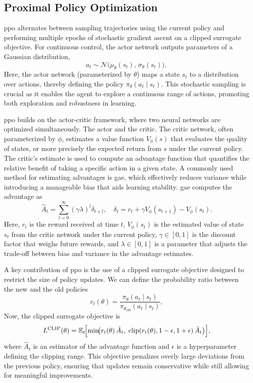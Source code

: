 \subsection{Proximal Policy Optimization}
\gls{ppo} \cite{schulman2017proximal} alternates between sampling trajectories using the current policy and performing multiple epochs of stochastic gradient ascent on a clipped surrogate objective. For continuous control, the actor network outputs parameters of a Gaussian distribution,
\[
a_t \sim \mathcal{N}\bigl(\mu_\theta(s_t),\,\sigma_\theta(s_t)\bigr),
\]
Here, the actor network (parameterized by \(\theta\)) maps a state \(s_t\) to a distribution over actions, thereby defining the policy \(\pi_\theta(a_t \mid s_t)\). This stochastic sampling is crucial as it enables the agent to explore a continuous range of actions, promoting both exploration and robustness in learning.

\gls{ppo} builds on the actor-critic framework, where two neural networks are optimized simultaneously. The actor and the critic. The critic network, often parameterized by \(\phi\), estimates a value function \(V_\phi(s)\) that evaluates the quality of states, or more precisely the expected return from \(s\) under the current policy. The critic's estimate is used to compute an advantage function that quantifies the relative benefit of taking a specific action in a given state. A commonly used method for estimating advantages is \gls{gae}, which effectively reduces variance while introducing a manageable bias that aids learning stability. \gls{gae} computes the advantage as
\[
\hat{A}_t = \sum_{l=0}^{\infty} (\gamma \lambda)^l \delta_{t+l}, 
\quad
\delta_t = r_t + \gamma V_\phi(s_{t+1}) - V_\phi(s_t).
\]
Here, \(r_t\) is the reward received at time \(t\), \(V_\phi(s_t)\) is the estimated value of state \(s_t\) from the critic network under the current policy, \(\gamma \in [0,1]\) is the discount factor that weighs future rewards, and \(\lambda \in [0,1]\) is a parameter that adjusts the trade-off between bias and variance in the advantage estimates.

A key contribution of \gls{ppo} is the use of a clipped surrogate objective designed to restrict the size of policy updates. We can define the probability ratio between the new and the old policies
\[
r_t(\theta) = \frac{\pi_\theta(a_t\mid s_t)}{\pi_{\theta_{\text{old}}}(a_t\mid s_t)},
\]
Now, the clipped surrogate objective is
\[
L^{\text{CLIP}}(\theta) = \mathbb{E}_t\!\Bigl[\min\!\bigl(r_t(\theta)\,\hat{A}_t,\;\text{clip}(r_t(\theta),1-\epsilon,1+\epsilon)\,\hat{A}_t\bigr)\Bigr],
\]
where \(\hat{A}_t\) is an estimator of the advantage function and \(\epsilon\) is a hyperparameter defining the clipping range. This objective penalizes overly large deviations from the previous policy, ensuring that updates remain conservative while still allowing for meaningful improvements.

